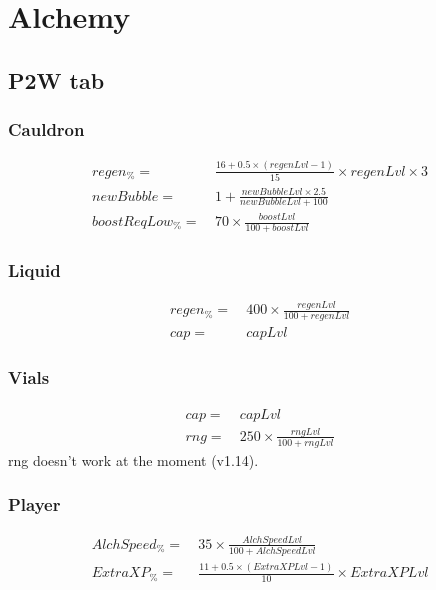 \chapter{Alchemy}
    \section{P2W tab}
        \subsection{Cauldron}
            \begin{align*}
                regen_\% = &\ \frac{16 + 0.5 \times (regenLvl-1)}{15} \times regenLvl \times 3
                \\ 
                newBubble = &\ 1 + \frac{newBubbleLvl \times 2.5}{newBubbleLvl + 100}
                \\
                boostReqLow_\% = &\ 70 \times \frac{boostLvl}{100+boostLvl}
            \end{align*}

        \subsection{Liquid}
            \begin{align*}
                regen_\% = &\ 400 \times \frac{regenLvl}{100+regenLvl}
                \\
                cap = &\ capLvl
            \end{align*}
        \subsection{Vials}
            \begin{align*}
                cap =  &\ capLvl
                \\
                rng = &\ 250 \times \frac{rngLvl}{100+rngLvl}
            \end{align*}
             rng doesn't work at the moment (v1.14). 
        \subsection{Player}
            \begin{align*}
                AlchSpeed_\% = &\ 35 \times \frac{AlchSpeedLvl}{100+AlchSpeedLvl} 
                \\
                ExtraXP_\% = &\ \frac{11 + 0.5 \times (ExtraXPLvl-1)}{10} \times ExtraXPLvl
            \end{align*}
